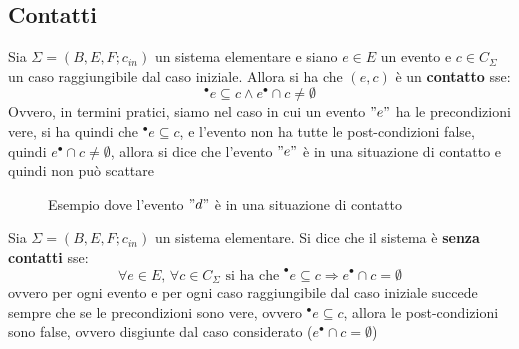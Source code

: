 \subsection{Contatti}
\begin{definizione}
  Sia $\Sigma = (B, E, F;c_{in})$ un sistema elementare e siano $e\in E$ un evento
  e $c\in C_\Sigma$ un caso raggiungibile dal caso iniziale. Allora si ha che
  $(e, c)$ è un \textbf{contatto} sse:
  \[^\bullet e\subseteq c \wedge e^\bullet \cap c \neq\emptyset\]
  Ovvero, in termini pratici, siamo nel caso in cui un evento $"e"$ ha le
  precondizioni vere, si ha quindi che $^\bullet e\subseteq c$, e l'evento non
  ha tutte le post-condizioni false, quindi $e^\bullet \cap c \neq\emptyset$,
  allora si dice che l'evento $"e"$ è in una situazione di contatto e quindi non
  può scattare
  \begin{figure}[H]
    \centering
    \caption{Esempio dove l'evento $"d"$ è in una situazione di
      contatto}
  \end{figure}
\end{definizione} \vspace{5mm} %
\begin{definizione}
  Sia $\Sigma = (B, E, F;c_{in})$ un sistema elementare. Si dice che il sistema è
  \textbf{senza contatti} sse:
  \[\forall e\in E,\,\forall c\in C_\Sigma\mbox{ si ha che } ^\bullet
    e\subseteq c\Rightarrow e^\bullet\cap c=\emptyset\]
  ovvero per ogni evento e per ogni caso raggiungibile dal caso iniziale succede
  sempre che se le precondizioni sono vere, ovvero $^\bullet e\subseteq c$,
  allora le post-condizioni sono false, ovvero disgiunte dal caso considerato
  ($e^\bullet\cap c=\emptyset$)
\end{definizione} \vspace{5mm} %
